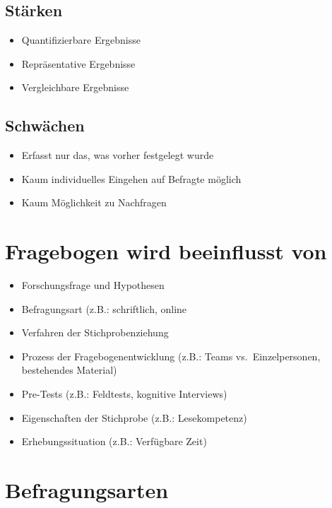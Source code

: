 \documentclass[
]{book}
\providecommand{\tightlist}{%
  \setlength{\itemsep}{0pt}\setlength{\parskip}{0pt}}
\begin{document}
\hypertarget{stuxe4rken}{%
\subsection{Stärken}\label{stuxe4rken}}

\begin{itemize}
\tightlist
\item
  Quantifizierbare Ergebnisse
\item
  Repräsentative Ergebnisse
\item
  Vergleichbare Ergebnisse
\end{itemize}

\hypertarget{schwuxe4chen}{%
\subsection{Schwächen}\label{schwuxe4chen}}

\begin{itemize}
\tightlist
\item
  Erfasst nur das, was vorher festgelegt wurde
\item
  Kaum individuelles Eingehen auf Befragte möglich
\item
  Kaum Möglichkeit zu Nachfragen
\end{itemize}

\hypertarget{fragebogen-wird-beeinflusst-von}{%
\section{Fragebogen wird beeinflusst von}\label{fragebogen-wird-beeinflusst-von}}

\begin{itemize}
\tightlist
\item
  Forschungsfrage und Hypothesen
\item
  Befragungsart (z.B.: schriftlich, online
\item
  Verfahren der Stichprobenziehung
\item
  Prozess der Fragebogenentwicklung (z.B.: Teams vs.~Einzelpersonen, bestehendes Material)
\item
  Pre-Tests (z.B.: Feldtests, kognitive Interviews)
\item
  Eigenschaften der Stichprobe (z.B.: Lesekompetenz)
\item
  Erhebungssituation (z.B.: Verfügbare Zeit)
\end{itemize}

\hypertarget{befragungsarten}{%
\section{Befragungsarten}\label{befragungsarten}}
\end{document}

